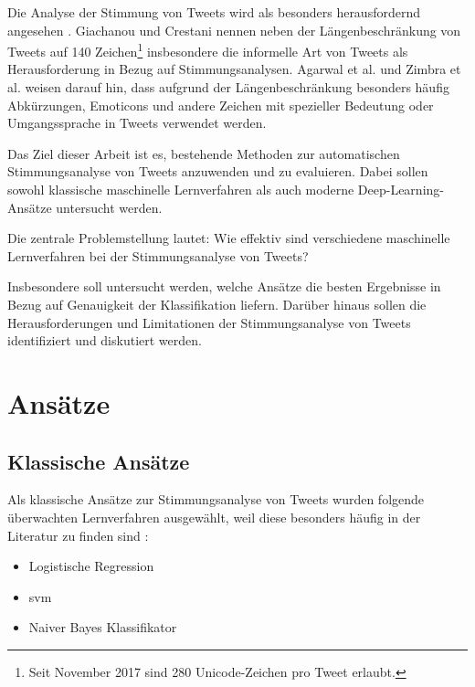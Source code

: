 \documentclass[researchlab,group,]{AIGpaper}
\begin{document}
Die Analyse der Stimmung von Tweets wird als besonders herausfordernd angesehen \cite{agarwal2011sentiment, giachanou2016like, zimbra2018state}.
Giachanou und Crestani \cite{giachanou2016like} nennen neben der Längenbeschränkung von Tweets auf 140 Zeichen\footnote{
    Seit November 2017 sind 280 Unicode-Zeichen pro Tweet erlaubt.
} insbesondere die informelle Art von Tweets als Herausforderung in Bezug auf Stimmungsanalysen.
Agarwal et al. \cite{agarwal2011sentiment} und Zimbra et al. \cite{zimbra2018state} weisen darauf hin, dass aufgrund der Längenbeschränkung besonders häufig Abkürzungen, Emoticons und andere Zeichen mit spezieller Bedeutung oder Umgangssprache in Tweets verwendet werden.
\newline


Das Ziel dieser Arbeit ist es, bestehende Methoden zur automatischen Stimmungsanalyse von Tweets anzuwenden und zu evaluieren.
Dabei sollen sowohl klassische maschinelle Lernverfahren als auch moderne Deep-Learning-Ansätze untersucht werden.

Die zentrale Problemstellung lautet: Wie effektiv sind verschiedene maschinelle Lernverfahren bei der Stimmungsanalyse von Tweets?

Insbesondere soll untersucht werden, welche Ansätze die besten Ergebnisse in Bezug auf Genauigkeit der Klassifikation liefern.
Darüber hinaus sollen die Herausforderungen und Limitationen der Stimmungsanalyse von Tweets identifiziert und diskutiert werden.


\section{Ansätze}

\subsection{Klassische Ansätze}

Als klassische Ansätze zur Stimmungsanalyse von Tweets wurden folgende überwachten Lernverfahren ausgewählt, weil diese besonders häufig in der Literatur zu finden sind \cite{wankhade2022survey, medhat2014sentiment, zimbra2018state}:

\begin{itemize}
    \item Logistische Regression
    \item \gls{svm}
    \item Naiver Bayes Klassifikator
\end{itemize}
\end{document}
